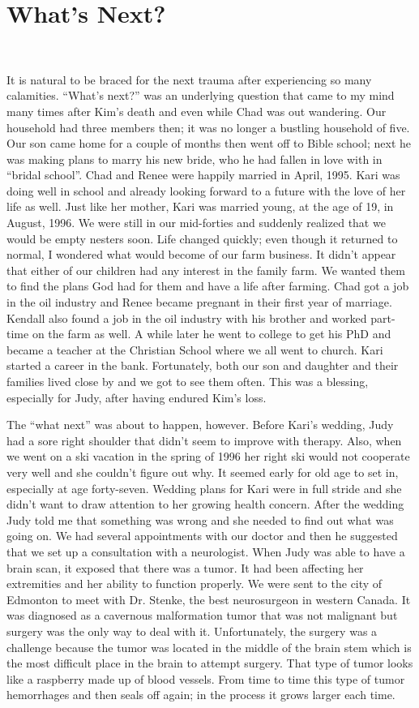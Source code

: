 \documentclass[twoside, 12pt]{book}
\begin{document}
\section{What's Next?}
\

It is natural to be braced for the next trauma after experiencing so many calamities. “What’s next?” was an underlying question that came to my mind many times after Kim's death and even while Chad was out wandering. Our household had three members then; it was no longer a bustling household of five. Our son came home for a couple of months then went off to Bible school; next he was making plans to marry his new bride, who he had fallen in love with in “bridal school”. Chad and Renee were happily married in April, 1995. Kari was doing well in school and already looking forward to a future with the love of her life as well. Just like her mother, Kari was married young, at the age of 19, in August, 1996. We were still in our mid-forties and suddenly realized that we would be empty nesters soon. Life changed quickly; even though it returned to normal, I wondered what would become of our farm business. It didn't appear that either of our children had any interest in the family farm. We wanted them to find the plans God had for them and have a life after farming. Chad got a job in the oil industry and Renee became pregnant in their first year of marriage. Kendall also found a job in the oil industry with his brother and worked part-time on the farm as well. A while later he went to college to get his PhD and became a teacher at the Christian School where we all went to church. Kari started a career in the bank. Fortunately, both our son and daughter and their families lived close by and we got to see them often. This was a blessing, especially for Judy, after having endured Kim’s loss.

The “what next” was about to happen, however. Before Kari's wedding, Judy had a sore right shoulder that didn't seem to improve with therapy. Also, when we went on a ski vacation in the spring of 1996 her right ski would not cooperate very well and she couldn't figure out why. It  seemed early for old age to set in, especially at age forty-seven. Wedding plans for Kari were in full stride and she didn't want to draw attention to her growing health concern. After the wedding Judy told me that something was wrong and she needed to find out what was going on. We had several appointments with our doctor and then he suggested that we set up a consultation with a neurologist. When Judy was able to have a brain scan, it exposed that there was a tumor. It had been affecting her extremities and her ability to function properly. We were sent to the city of Edmonton to meet with Dr. Stenke, the best neurosurgeon in western Canada. It was diagnosed as a cavernous malformation tumor that was not malignant but surgery was the only way to deal with it. Unfortunately, the surgery was a challenge because the tumor was located in the middle of the brain stem which is the most difficult place in the brain to attempt surgery. That type of tumor looks like a raspberry made up of blood vessels. From time to time this type of tumor hemorrhages and then seals off again; in the process it grows larger each time.
\end{document}
